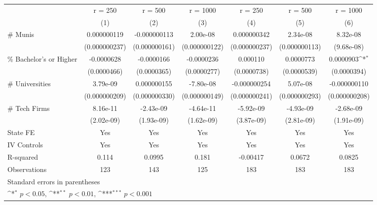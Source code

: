 {
\def\sym#1{\ifmmode^{#1}\else\(^{#1}\)\fi}
\begin{tabular}{l*{6}{c}}
\toprule
                    &\multicolumn{1}{c}{r = 250}&\multicolumn{1}{c}{r = 500}&\multicolumn{1}{c}{r = 1000}&\multicolumn{1}{c}{r = 250}&\multicolumn{1}{c}{r = 500}&\multicolumn{1}{c}{r = 1000}\\
                    &\multicolumn{1}{c}{(1)}         &\multicolumn{1}{c}{(2)}         &\multicolumn{1}{c}{(3)}         &\multicolumn{1}{c}{(4)}         &\multicolumn{1}{c}{(5)}         &\multicolumn{1}{c}{(6)}         \\
\midrule
\# Munis            & 0.000000119         &-0.000000113         &    2.00e-08         & 0.000000342         &    2.34e-08         &    8.32e-08         \\
                    &(0.000000237)         &(0.000000161)         &(0.000000122)         &(0.000000237)         &(0.000000113)         &  (9.68e-08)         \\
\addlinespace
\% Bachelor's or Higher&  -0.0000628         &  -0.0000166         &  -0.0000236         &    0.000110         &   0.0000773         &   0.0000903\sym{*}  \\
                    & (0.0000466)         & (0.0000365)         & (0.0000277)         & (0.0000738)         & (0.0000539)         & (0.0000394)         \\
\addlinespace
\# Universities     &    3.79e-09         & 0.000000155         &   -7.80e-08         &-0.000000254         &    5.07e-08         &-0.000000110         \\
                    &(0.000000209)         &(0.000000330)         &(0.000000149)         &(0.000000241)         &(0.000000293)         &(0.000000208)         \\
\addlinespace
\# Tech Firms       &    8.16e-11         &   -2.43e-09         &   -4.64e-11         &   -5.92e-09         &   -4.93e-09         &   -2.68e-09         \\
                    &  (2.02e-09)         &  (1.93e-09)         &  (1.62e-09)         &  (3.87e-09)         &  (2.81e-09)         &  (1.91e-09)         \\
\midrule
State FE            &         Yes         &         Yes         &         Yes         &         Yes         &         Yes         &         Yes         \\
IV Controls         &         Yes         &         Yes         &         Yes         &         Yes         &         Yes         &         Yes         \\
R-squared           &       0.114         &      0.0995         &       0.181         &    -0.00417         &      0.0672         &      0.0825         \\
Observations        &         123         &         143         &         125         &         183         &         183         &         183         \\
\bottomrule
\multicolumn{7}{l}{\footnotesize Standard errors in parentheses}\\
\multicolumn{7}{l}{\footnotesize \sym{*} \(p<0.05\), \sym{**} \(p<0.01\), \sym{***} \(p<0.001\)}\\
\end{tabular}
}
